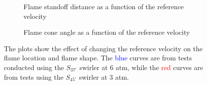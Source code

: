 \begin{figure}

\begin{subfigure}{\linewidth}
  \centering
  
  \caption{Flame standoff distance as a function of the reference velocity}
  \label{fig:referenceVelocityDistance}
\end{subfigure}

\begin{subfigure}{\linewidth}
  \centering
  
  \caption{Flame cone angle as a function of the reference velocity}
  \label{fig:referenceVelocityAngle}
\end{subfigure}

\caption[Effect of reference velocity on the flame location and shape]{The plots show the effect of changing the reference velocity on the flame location and flame shape. The \textcolor{blue}{blue} curves are from tests conducted using the \(S_{37^\circ}\) swirler at 6 atm, while the \textcolor{red}{red} curves are from tests using the \(S_{45^\circ}\) swirler at 3 atm.}

\label{fig:referenceVelocityResults}

\end{figure}

